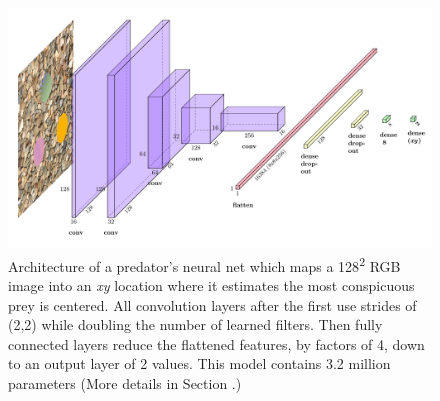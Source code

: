 \documentclass[letterpaper]{article}
\begin{document}
\begin{figure}[t]
    \includegraphics[width=\columnwidth]{predator_cnn.pdf}
    \caption{Architecture of a predator's neural net which maps a 128\textsuperscript{2} RGB image into an \textit{xy} location where it estimates the most conspicuous prey is centered. All convolution layers after the first use strides of (2,2) while doubling the number of learned filters. Then fully connected layers reduce the flattened features, by factors of 4, down to an output layer of 2 values. This model contains 3.2 million parameters (More details in Section .)}
    \label{fig:predator_cnn}
\end{figure}

\end{document}
